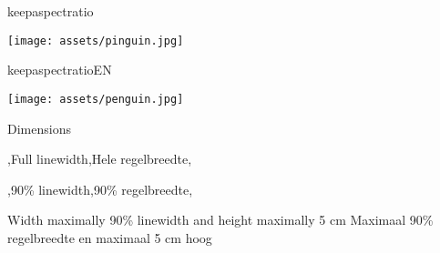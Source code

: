 \begin{saveblock}{keepaspectratio}
	\begin{highlightblock}[gobble=8]
		\texttt{[image: assets/pinguin.jpg]}
	\end{highlightblock}
\end{saveblock}

\begin{saveblock}{keepaspectratioEN}
	\begin{highlightblock}[gobble=8]
		\texttt{[image: assets/penguin.jpg]}
	\end{highlightblock}
\end{saveblock}


\begin{frame}{Dimensions}
	\begin{noindentlist}\setlength{\itemsep}{20pt}
		\item \lang,Full linewidth,Hele regelbreedte,\\
		
		
		\item \lang,90\% linewidth,90\% regelbreedte,\\
		
		\item \lang
		{Width maximally 90\% linewidth and height maximally 5 cm}
		{Maximaal 90\% regelbreedte en maximaal 5 cm hoog}
	\end{noindentlist}
\end{frame}
